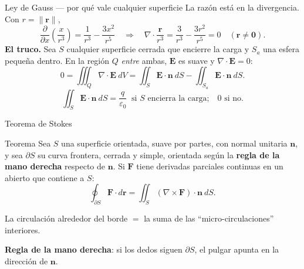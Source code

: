 \documentclass[11pt,aspectratio=169]{beamer}
\begin{document}
\begin{frame}{Ley de Gauss --- por qué vale cualquier superficie}
  La razón está en la divergencia. Con $r=\|\mathbf r\|$,
  \[
    \frac{\partial}{\partial x}\left(\frac{x}{r^{3}}\right)=\frac{1}{r^{3}}-\frac{3x^{2}}{r^{5}}
    \quad\Longrightarrow\quad
    \nabla\cdot\frac{\mathbf r}{r^{3}}=\frac{3}{r^{3}}-\frac{3r^{2}}{r^{5}}=0
    \quad (\mathbf r\neq\mathbf 0).
  \]
  \pause
  \pause
  \textbf{El truco.} Sea $S$ cualquier superficie cerrada que encierre la carga y $S_a$ una esfera pequeña dentro. En la región $Q$ \emph{entre} ambas, $\mathbf E$ es suave y $\nabla\cdot\mathbf E=0$:
  \[
    0=\iiint_Q \nabla\cdot\mathbf E\ dV
     = \iint_{S}\mathbf E\cdot\mathbf n\ dS-\iint_{S_a}\mathbf E\cdot\mathbf n\ dS .
  \]
  \pause
  \[
    \boxed{\iint_S \mathbf E\cdot\mathbf n\ dS=\frac{q}{\varepsilon_0}\ \text{ si } S \text{ encierra la carga;}\quad 0 \text{ si no.}}
  \]
\end{frame}

\begin{frame}{Teorema de Stokes}
  \begin{block}{Teorema}
    Sea $S$ una superficie orientada, suave por partes, con normal unitaria $\mathbf n$, y sea $\partial S$ su curva frontera, cerrada y simple, orientada según la \textbf{regla de la mano derecha} respecto de $\mathbf n$. Si $\mathbf F$ tiene derivadas parciales continuas en un abierto que contiene a $S$:
    \[
      \oint_{\partial S}\mathbf F\cdot d\mathbf r
      = \iint_S (\nabla\times\mathbf F)\cdot\mathbf n\ dS.
    \]
  \end{block}
  \pause
  \vspace{4pt}
  \begin{center}
  \normalsize\color{tealx}
  La circulación alrededor del borde $=$ la suma de las ``micro-circulaciones'' interiores.
  \end{center}
  \pause
  \begin{center}\small\color{gray60}
  \textbf{Regla de la mano derecha}: si los dedos siguen $\partial S$, el pulgar apunta en la dirección de $\mathbf n$.
  \end{center}
\end{frame}
\end{document}
